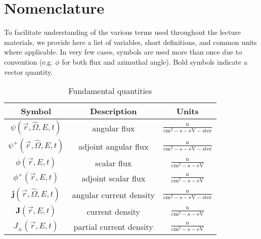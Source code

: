 \chapter{Nomenclature}

To facilitate understanding of the various terms used throughout the lecture materials, we provide here a list of variables, short definitions, and common units where applicable.  In very few cases, symbols are used more than once due to convention (e.g. $\phi$ for both flux and azimuthal angle).  Bold symbols indicate a vector quantity.

\begin{table}[th]
 \caption{Fundamental quantities}
 \begin{center} 
 {\small
 \begin{tabular*}{0.90\textwidth}{@{\extracolsep{\fill}} ccc } 
  \toprule 
   Symbol                            & Description   & Units  \\
  \midrule 
   $\psi(\vec{r},\hat{\Omega},E,t)$          & angular flux                  & $\frac{\mathrm{n}}{\mathrm{cm^2-s-eV-ster}}$  \\
   $\psi^+(\vec{r},\hat{\Omega},E,t)$        & adjoint angular flux          & $\frac{\mathrm{n}}{\mathrm{cm^2-s-eV-ster}}$  \\
   $\phi(\vec{r},E,t)$                       & scalar  flux                  & $\frac{\mathrm{n}}{\mathrm{cm^2-s-eV}}$  \\
   $\phi^+(\vec{r},E,t)$                     & adjoint scalar flux           & $\frac{\mathrm{n}}{\mathrm{cm^2-s-eV}}$  \\
   $\mathbf{j}(\vec{r},\hat{\Omega},E,t)$    & angular current density       & $\frac{\mathrm{n}}{\mathrm{cm^2-s-eV-ster}}$  \\
   $\mathbf{ J}(\vec{r},E,t) $               & current density               & $\frac{\mathrm{n}}{\mathrm{cm^2-s-eV}}$  \\
   $J_{\pm}(\vec{r},E,t)$                    & partial current density       & $\frac{\mathrm{n}}{\mathrm{cm^2-s-eV}}$  \\
  \bottomrule 
 \end{tabular*} 
 }
 \end{center} 
 \label{tbl:snmeshstudy}  
\end{table}

